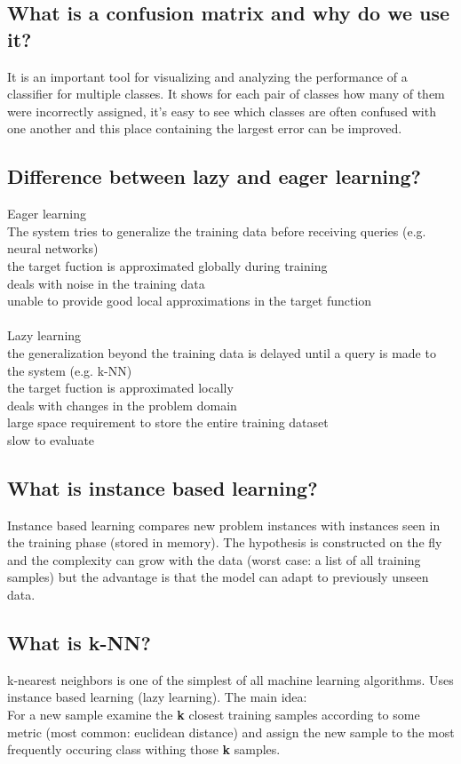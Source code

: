 \documentclass[12pt]{scrartcl}
\begin{document}
\subsection{What is a confusion matrix and why do we use it?}
It is an important tool for visualizing and analyzing the performance of a classifier for multiple classes. It shows for each pair of classes how many of them were incorrectly assigned, it's easy to see which classes are often confused with one another and this place containing the largest error can be improved.

\subsection{Difference between lazy and eager learning?}
Eager learning \\
The system tries to generalize the training data before receiving queries (e.g. neural networks) \\
{\color{ForestGreen} the target fuction is approximated globally during training } \\
{\color{ForestGreen} deals with noise in the training data} \\
{\color{red} unable to provide good local approximations in the target function} \\
\\
Lazy learning \\
the generalization beyond the training data is delayed until a query is made to the system (e.g. k-NN) \\
{\color{ForestGreen} the target fuction is approximated locally } \\
{\color{ForestGreen} deals with changes in the problem domain} \\
{\color{red} large space requirement to store the entire training dataset} \\ 
{\color{red} slow to evaluate }

\subsection{What is instance based learning?}
Instance based learning compares new problem instances with instances seen in the training phase (stored in memory). The hypothesis is constructed on the fly and the complexity can grow with the data (worst case: a list of all training samples) but the advantage is that the model can adapt to previously unseen data.

\subsection{What is k-NN?}
k-nearest neighbors is one of the simplest of all machine learning algorithms. Uses instance based learning (lazy learning). The main idea: \\
For a new sample examine the {\bf k} closest training samples according to some metric (most common: euclidean distance) and assign the new sample to the most frequently occuring class withing those {\bf k} samples.
\end{document}
